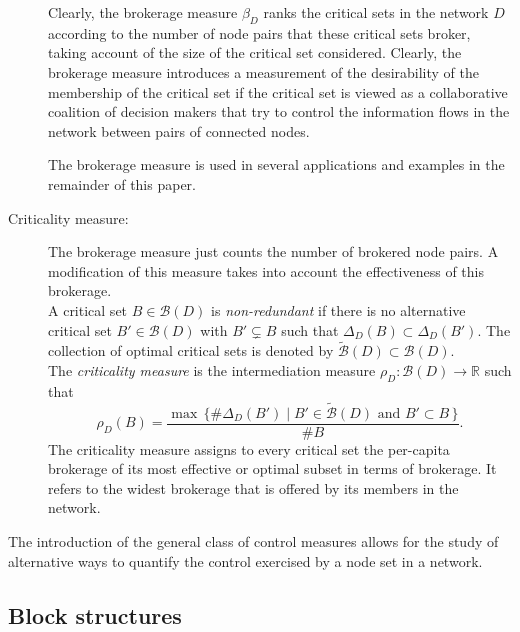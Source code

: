 \begin{description}
Clearly, the brokerage measure $\beta_D$ ranks the critical sets in the network $D$ according to the number of node pairs that these critical sets broker, taking account of the size of the critical set considered. Clearly, the brokerage measure introduces a measurement of the desirability of the membership of the critical set if the critical set is viewed as a collaborative coalition of decision makers that try to control the information flows in the network between pairs of connected nodes.

The brokerage measure is used in several applications and examples in the remainder of this paper.

\item[Criticality measure:] The brokerage measure just counts the number of brokered node pairs. A modification of this measure takes into account the effectiveness of this brokerage.
\\
A critical set $B \in \mathcal{B} (D)$ is \emph{non-redundant} if there is no alternative critical set $B' \in \mathcal{B} (D)$ with $B' \subsetneq B$ such that $\Delta_D (B) \subset \Delta_D (B')$. The collection of optimal critical sets is denoted by $\widetilde{\mathcal{B}} (D) \subset \mathcal{B} (D)$.
\\
The \emph{criticality measure} is the intermediation measure $\rho_D \colon \mathcal{B} (D) \to \mathbb{R}$ such that
\begin{equation}
\rho_D (B) = \frac{\max \, \{ \# \Delta_D (B') \mid B' \in \widetilde{\mathcal{B}} (D) \mbox{ and } B' \subset B \, \}}{\# B} .
\end{equation}
The criticality measure assigns to every critical set the per-capita brokerage of its most effective or optimal subset in terms of brokerage. It refers to the widest brokerage that is offered by its members in the network.

\end{description}
The introduction of the general class of control measures allows for the study of alternative ways to quantify the control exercised by a node set in a network.

\subsection{Block structures}

